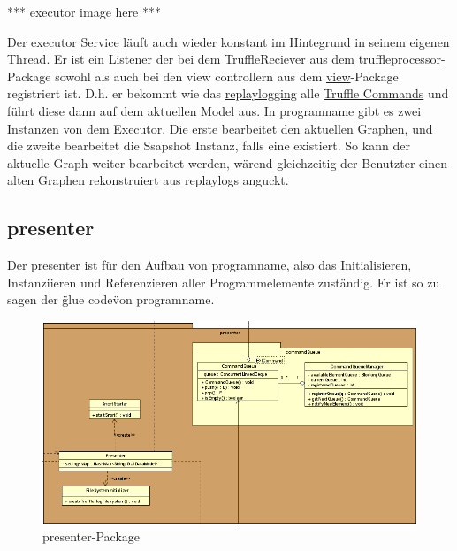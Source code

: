     *** executor image here ***
    \newline
    \newline

    Der executor Service läuft auch wieder konstant im Hintegrund in seinem
    eigenen Thread. Er ist ein Listener der bei dem TruffleReciever aus dem
    \hyperref[subsubsec:truffleprocessor]{truffleprocessor}-Package sowohl als
    auch bei den view controllern aus dem \hyperref[subsec:view]{view}-Package
    registriert ist. D.h. er bekommt wie das \hyperref[subsubsec:replaylogging]{replaylogging}
    alle \hyperref[subsubsec:trufflecommand]{Truffle Commands} und führt diese
    dann auf dem aktuellen Model aus.
    \newline
    \newline
    In \gls{programname} gibt es zwei Instanzen von dem Executor. Die erste bearbeitet
    den aktuellen Graphen, und die zweite bearbeitet die Ssapshot Instanz, falls
    eine existiert. So kann der aktuelle Graph weiter bearbeitet werden, wärend
    gleichzeitig der Benutzter einen alten Graphen rekonstruiert aus
    \glspl{replaylog} anguckt.


\subsection{presenter}
\label{subsec:presenter}

Der presenter ist für den Aufbau von \gls{programname}, also das
Initialisieren, Instanziieren und Referenzieren aller Programmelemente zuständig.
Er ist so zu sagen der \"glue code\" von \gls{programname}.

\begin{figure}[H]
  \centering
  \includegraphics[width=\textwidth]{../diagramimages/presenter.png}
  \caption{presenter-Package}
\end{figure}

